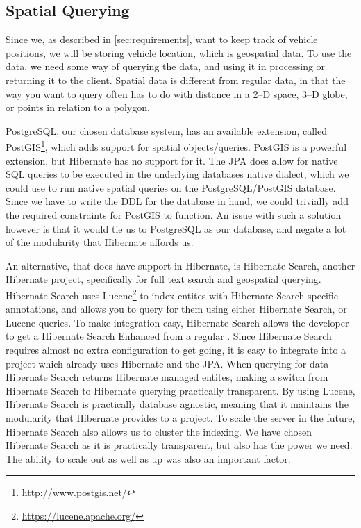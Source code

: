 \subsection{Spatial Querying}\label{subsubsec:spatialqueringtech}
Since we, as described in \cref{sec:requirements}, want to keep track of vehicle positions, we will be storing vehicle location, which is geospatial data.
To use the data, we need some way of querying the data, and using it in processing or returning it to the client.
Spatial data is different from regular data, in that the way you want to query often has to do with distance in a 2--D space, 3--D globe, or points in relation to a polygon.

PostgreSQL, our chosen database system, has an available extension, called PostGIS\footnote{\url{http://www.postgis.net/}}, which adds support for spatial objects/queries.
PostGIS is a powerful extension, but Hibernate has no support for it.
The \ac{JPA} does allow for native \ac{SQL} queries to be executed in the underlying databases native dialect, which we could use to run native spatial queries on the PostgreSQL/PostGIS database.
Since we have to write the \ac{DDL} for the database in hand, we could trivially add the required constraints for PostGIS to function.
An issue with such a solution however is that it would tie us to PostgreSQL as our database, and negate a lot of the modularity that Hibernate affords us.

An alternative, that does have support in Hibernate, is Hibernate Search, another Hibernate project, specifically for full text search and geospatial querying.
Hibernate Search uses Lucene\footnote{\url{https://lucene.apache.org/}} to index entites with Hibernate Search specific annotations, and allows you to query for them using either Hibernate Search, or Lucene queries.
To make integration easy, Hibernate Search allows the developer to get a Hibernate Search Enhanced  from a regular .
Since Hibernate Search requires almost no extra configuration to get going, it is easy to integrate into a project which already uses Hibernate and the \ac{JPA}.
When querying for data Hibernate Search returns Hibernate managed entites, making a switch from Hibernate Search to Hibernate querying practically transparent.
By using Lucene, Hibernate Search is practically database agnostic, meaning that it maintains the modularity that Hibernate provides to a project.
To scale the server in the future, Hibernate Search also allows us to cluster the indexing.
We have chosen Hibernate Search as it is practically transparent, but also has the power we need.
The ability to scale out as well as up was also an important factor.


